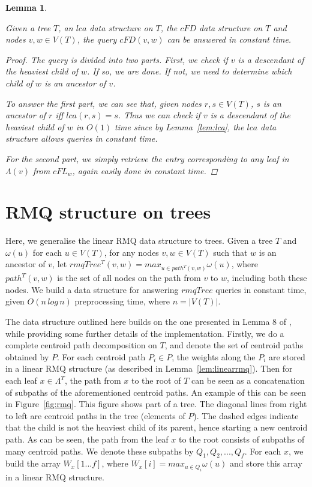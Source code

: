 \documentclass{article}
\newcommand{\leafset}{\Lambda}
\newcommand{\weight}{\omega}
\newtheorem{cfdquery}[incompatibility]{Lemma}
\begin{document}
    \medskip
    \begin{cfdquery}
        \label{lem:cfdquery}

        Given a tree $T$, an $lca$ data structure on $T$, the $cFD$ data structure on $T$ and nodes $v, w \in V(T)$, the query $cFD(v, w)$ can be answered in constant time.

        \begin{proof}
            The query is divided into two parts. First, we check if $v$ is a descendant of the heaviest child of $w$. If so, we are done. If not, we need to determine which child of $w$ is an ancestor of $v$.

            To answer the first part, we can see that, given nodes $r, s \in V(T)$, $s$ is an ancestor of $r$ iff $lca(r, s) = s$. Thus we can check if $v$ is a descendant of the heaviest child of $w$ in $O(1)$ time since by Lemma~\ref{lem:lca}, the $lca$ data structure allows queries in constant time.

            For the second part, we simply retrieve the entry corresponding to any leaf in $\leafset(v)$ from $cFL_w$, again easily done in constant time.
        \end{proof}
    \end{cfdquery}

    \section{RMQ structure on trees}
    \label{sec:rmqtree}

    Here, we generalise the linear RMQ data structure to trees. Given a tree $T$ and $\weight(u)$ for each $u \in V(T)$, for any nodes $v, w \in V(T)$ such that $w$ is an ancestor of $v$, let $rmqTree^T(v, w) = max_{u \in path^T(v, w)}\weight(u)$, where $path^T(v, w)$ is the set of all nodes on the path from $v$ to $w$, including both these nodes. We build a data structure for answering $rmqTree$ queries in constant time, given $O(n\,log\,n)$ preprocessing time, where $n = |V(T)|$.

    The data structure outlined here builds on the one presented in Lemma 8 of \cite{jansson2018algorithms}, while providing some further details of the implementation. Firstly, we do a complete centroid path decomposition on $T$, and denote the set of centroid paths obtained by $P$. For each centroid path $P_i \in P$, the weights along the $P_i$ are stored in a linear RMQ structure (as described in Lemma~\ref{lem:linearrmq}). Then for each leaf $x \in \leafset^T$, the path from $x$ to the root of $T$ can be seen as a concatenation of subpaths of the aforementioned centroid paths. An example of this can be seen in Figure~\ref{fig:rmq}. This figure shows part of a tree. The diagonal lines from right to left are centroid paths in the tree (elements of $P$). The dashed edges indicate that the child is not the heaviest child of its parent, hence starting a new centroid path. As can be seen, the path from the leaf $x$ to the root consists of subpaths of many centroid paths. We denote these subpaths by $Q_1, Q_2, ..., Q_f$. For each $x$, we build the array $W_x[1 ... f]$, where $W_x[i] = max_{u \in Q_i}\weight(u)$ and store this array in a linear RMQ structure.
\end{document}
